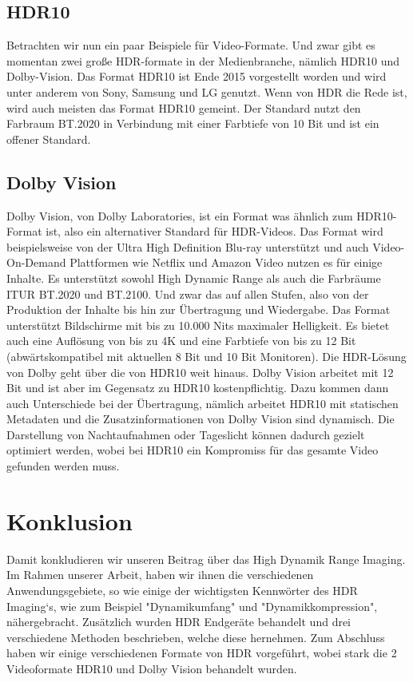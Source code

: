 \documentclass[11pt, a4paper, twocolumn]{article}
\begin{document}
	\subsection{HDR10}
	Betrachten wir nun ein paar Beispiele für Video-Formate. Und zwar gibt es momentan zwei große HDR-formate in der Medienbranche, nämlich HDR10 und Dolby-Vision.
	Das Format HDR10 ist Ende 2015 vorgestellt worden und wird unter anderem von Sony, Samsung und LG genutzt. Wenn von HDR die Rede ist, wird auch meisten das Format HDR10 gemeint. Der Standard nutzt den Farbraum BT.2020 in Verbindung mit einer Farbtiefe von 10 Bit und ist ein offener Standard.
	\subsection{Dolby Vision}
	Dolby Vision, von Dolby Laboratories, ist ein Format was ähnlich zum HDR10-Format ist, also ein alternativer Standard für HDR-Videos. Das Format wird beispielsweise von der Ultra High Definition Blu-ray unterstützt und auch Video-On-Demand Plattformen wie Netflix und Amazon Video nutzen es für einige Inhalte. Es unterstützt sowohl High Dynamic Range als auch die Farbräume ITUR BT.2020 und BT.2100. Und zwar das auf allen Stufen, also von der Produktion der Inhalte bis hin zur Übertragung und Wiedergabe. Das Format unterstützt Bildschirme mit bis zu 10.000 Nits maximaler Helligkeit. Es bietet auch eine Auflösung von bis zu 4K und eine Farbtiefe von bis zu 12 Bit (abwärtskompatibel mit aktuellen 8 Bit und 10 Bit Monitoren). Die HDR-Lösung von Dolby geht über die von HDR10 weit hinaus. Dolby Vision arbeitet mit 12 Bit und ist aber im Gegensatz zu HDR10 kostenpflichtig. Dazu kommen dann auch Unterschiede bei der Übertragung, nämlich arbeitet HDR10 mit statischen Metadaten und die Zusatzinformationen von Dolby Vision sind dynamisch. Die Darstellung von Nachtaufnahmen oder Tageslicht können dadurch gezielt optimiert werden, wobei bei HDR10 ein Kompromiss für das gesamte Video gefunden werden muss.
	\section{Konklusion}
	Damit konkludieren wir unseren Beitrag über das High Dynamik Range Imaging. Im Rahmen unserer Arbeit, haben wir ihnen die verschiedenen Anwendungsgebiete, so wie einige der wichtigsten Kennwörter des HDR Imaging‘s, wie zum Beispiel "Dynamikumfang" und "Dynamikkompression", nähergebracht. Zusätzlich wurden HDR Endgeräte behandelt und drei verschiedene Methoden beschrieben, welche diese hernehmen. Zum Abschluss haben wir einige verschiedenen Formate von HDR vorgeführt, wobei stark die 2 Videoformate HDR10 und Dolby Vision behandelt wurden.
	
	\nocite{*}
	
	
	\listoffigures
	
\end{document}
